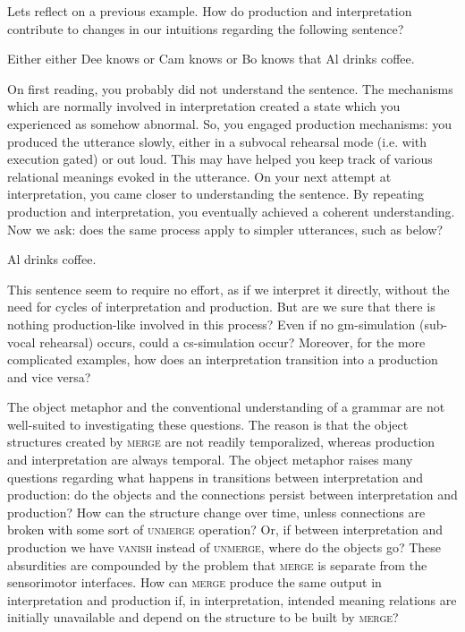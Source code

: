   Lets reflect on a previous example. How do production and interpretation contribute to changes in our intuitions regarding the following sentence? 

\ea
Either either Dee knows or Cam knows or Bo knows that Al drinks coffee.
\z

  On first reading, you probably did not understand the sentence. The mechanisms which are normally involved in interpretation created a state which you experienced as somehow abnormal. So, you engaged production mechanisms: you produced the utterance slowly, either in a subvocal rehearsal mode (i.e. with execution gated) or out loud. This may have helped you keep track of various relational meanings evoked in the utterance. On your next attempt at interpretation, you came closer to understanding the sentence. By repeating production and interpretation, you eventually achieved a coherent understanding. Now we ask: does the same process apply to simpler utterances, such as below?

\ea
Al drinks coffee.
\z

  This sentence seem to require no effort, as if we interpret it directly, without the need for cycles of interpretation and production. But are we sure that there is nothing production-like involved in this process? Even if no gm-simulation (sub-vocal rehearsal) occurs, could a cs-simulation occur? Moreover, for the more complicated examples, how does an interpretation transition into a production and vice versa?

  The object metaphor and the conventional understanding of a grammar are not well-suited to investigating these questions. The reason is that the object structures created by \textsc{merge} are not readily temporalized, whereas production and interpretation are always temporal. The object metaphor raises many questions regarding what happens in transitions between interpretation and production: do the objects and the connections persist between interpretation and production? How can the structure change over time, unless connections are broken with some sort of \textsc{unmerge} operation? Or, if between interpretation and production we have \textsc{vanish} instead of \textsc{unmerge}, where do the objects go? These absurdities are compounded by the problem that \textsc{merge} is separate from the sensorimotor interfaces. How can \textsc{merge} produce the same output in interpretation and production if, in interpretation, intended meaning relations are initially unavailable and depend on the structure to be built by \textsc{merge?} 

